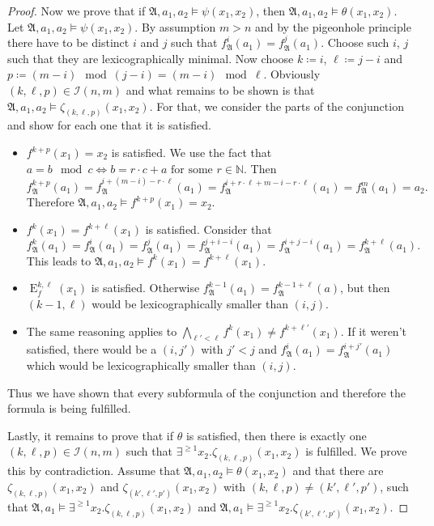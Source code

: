 \begin{proof}
	Now we prove that if $\mathfrak A,a_1,a_2 \models \psi(x_1,x_2)$, then $\mathfrak A,a_1,a_2 \models \theta(x_1,x_2)$. 
	Let $\mathfrak A,a_1,a_2\models \psi(x_1,x_2)$. By assumption $m>n$ and by the pigeonhole principle there have to be distinct $i$ and $j$ such that $f_{\mathfrak A}^{i}(a_1)=f_{\mathfrak A}^{j}(a_1)$.
	Choose such $i$, $j$ such that they are lexicographically minimal.
	Now choose $k\coloneqq i$, $\ell \coloneqq j-i$ and $p\coloneqq (m-i) \mod (j-i)= (m-i) \mod \ell$.
	Obviously $(k,\ell,p)\in\mathcal I(n,m)$ and what remains to be shown is that $\mathfrak A,a_1,a_2\models \zeta_{(k,\ell,p)}(x_1,x_2)$.
	For that, we consider the parts of the conjunction and show for each one that it is satisfied.
	
	\begin{itemize}
		\item $f^{k+p}(x_1)=x_2$ is satisfied.
		We use the fact that $a= b \mod c \Leftrightarrow b = r\cdot c +a \text{ for some } r\in \mathbb N$.
		Then
		$$f_{\mathfrak A}^{k+p}(a_1)=f_{\mathfrak A}^{i+(m-i)-r\cdot \ell}(a_1)=f_{\mathfrak A}^{i+r\cdot \ell + m -i - r\cdot \ell}(a_1)=f_{\mathfrak A}^{m}(a_1)=a_2.$$
		Therefore $\mathfrak A,a_1,a_2\models f^{k+p}(x_1)=x_2$.
		
		\item $f^{k}(x_1)=f^{k+\ell}(x_1)$ is satisfied.
		Consider that
		$$f_{\mathfrak A}^{k}(a_1)=f_{\mathfrak A}^{i}(a_1)=f_{\mathfrak A}^{j}(a_1)=f_{\mathfrak A}^{j+i-i}(a_1)=f_{\mathfrak A}^{i+j-i}(a_1)=f_{\mathfrak A}^{k+\ell}(a_1).$$
		This leads to $\mathfrak A,a_1,a_2\models f^{k}(x_1)=f^{k+\ell}(x_1)$.
		
		\item $\operatorname{E}^{k,\ell}_f(x_1)$ is satisfied.
		Otherwise $f_{\mathfrak A}^{k-1}(a_1)=f_{\mathfrak A}^{k-1+\ell}(a)$, but then $(k-1,\ell)$ would be lexicographically smaller than $(i,j)$.
		
		\item The same reasoning applies to $\bigwedge_{\ell'<\ell}f^{k}(x_1)\neq f^{k+\ell'}(x_1)$. 
		If it weren't satisfied, there would be a $(i,j')$ with $j'<j$ and $f_{\mathfrak A}^{i}(a_1)=f_{\mathfrak A}^{i+j'}(a_1)$ which would be lexicographically smaller than $(i,j)$.
	\end{itemize}
	
	Thus we have shown that every subformula of the conjunction and therefore the formula is being fulfilled.
	
	Lastly, it remains to prove that if $\theta$ is satisfied, then there is exactly one $(k,\ell,p)\in\mathcal{I}(n,m)$ such that $\exists^{\geq 1}x_2.\zeta_{(k,\ell,p)}(x_1, x_2)$ is fulfilled.
	We prove this by contradiction.
	Assume that $\mathfrak A,a_1,a_2\models \theta(x_1,x_2)$ and that there are $\zeta_{(k,\ell,p)}(x_1,x_2)$ and $\zeta_{(k',\ell',p')}(x_1,x_2)$ with $(k,\ell,p)\neq (k',\ell',p')$, such that $\mathfrak A,a_1\models \exists^{\geq 1}x_2.\zeta_{(k,\ell,p)}(x_1,x_2)$ and $\mathfrak A,a_1\models \exists^{\geq 1}x_2.\zeta_{(k',\ell',p')}(x_1,x_2)$.
	

\end{proof}

